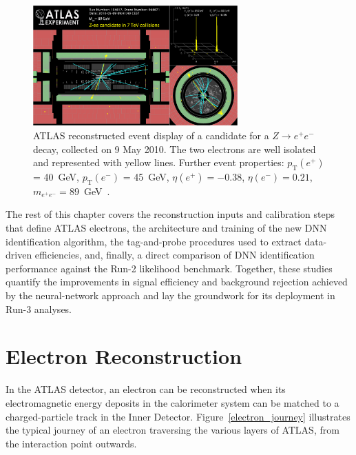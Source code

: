 \begin{figure}[htbp]
    \centering
    \includegraphics[width=0.7\textwidth]{images/Zee.png}
    \caption{ATLAS reconstructed event display of a candidate for a $Z\to e^+e^-$ decay, collected on 9 May 2010. The two electrons are well isolated and represented with yellow lines. Further event properties: $p_{\text{T}}(e^{+})$ = 40~GeV, $p_{\text{T}}(e^{-})$ = 45~GeV, $\eta(e^{+}) = -0.38$, $\eta(e^{-}) = 0.21$, $m_{e^{+}e^{-}}=89$~GeV~\cite{atlas:eventdisplay}. }
    \label{fig:zee}
\end{figure}

The rest of this chapter covers the reconstruction inputs and calibration steps that define ATLAS electrons, the architecture and training of the new DNN identification algorithm, the tag-and-probe procedures used to extract data-driven efficiencies, and, finally, a direct comparison of DNN identification performance against the Run-2 likelihood benchmark. Together, these studies quantify the improvements in signal efficiency and background rejection achieved by the neural-network approach and lay the groundwork for its deployment in Run-3 analyses.  

\section{Electron Reconstruction}
\label{sec:electron_reconstruction}

In the ATLAS detector, an electron can be reconstructed when its electromagnetic energy deposits in the calorimeter system can be matched to a charged-particle track in the Inner Detector. Figure~\ref{electron_journey} illustrates the typical journey of an electron traversing the various layers of ATLAS, from the interaction point outwards.

